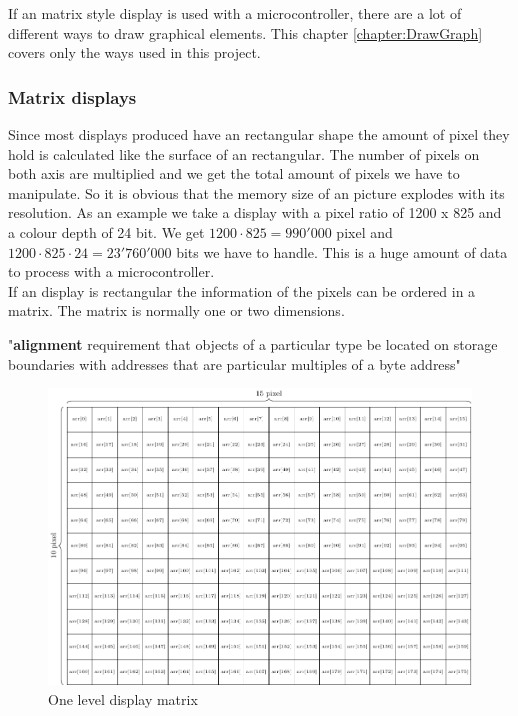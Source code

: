 
If an matrix style display is used with a microcontroller, there are a lot of different ways to draw graphical elements. This chapter \ref{chapter:DrawGraph} covers only the ways used in this project. 

\subsubsection{Matrix displays}

Since most displays produced have an rectangular shape the amount of pixel they hold is calculated like the surface of an rectangular. The number of pixels on both axis are multiplied and we get the total amount of pixels we have to manipulate. So it is obvious that the memory size of an picture explodes with its resolution. As an example we take a display with a pixel ratio of 1200 x 825 and a colour depth of 24 bit. We get $1200\cdot825=990'000$ pixel and $1200\cdot825\cdot24=23'760'000$ bits we have to handle. This is a huge amount of data to process with a microcontroller.\\
If an display is rectangular the information of the pixels can be ordered in a matrix. The matrix is normally one or two dimensions. 

\begin{displayquote}
"\textbf{alignment} requirement that objects of a particular type be located on storage boundaries with
addresses that are particular multiples of a byte address"	
\end{displayquote}\cite{ISO/IEC9899}

\begin{figure}[H]
	\centering
	\includegraphics[width=1\textwidth]{2-theory/drawing-graphics/graphics/matrix.pdf}
	\caption{One level display matrix \label{theory:matrix}}
\end{figure}

